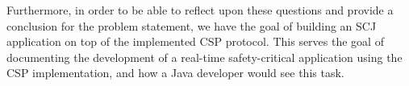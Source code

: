 Furthermore, in order to be able to reflect upon these questions and provide a conclusion for the problem statement, we have the goal of building an SCJ application on top of the implemented CSP protocol. This serves the goal of documenting the development of a real-time safety-critical application using the CSP implementation, and how a Java developer would see this task.




